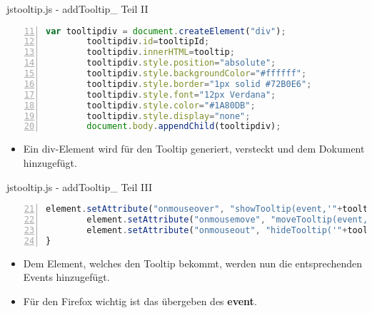 \begin{frame}[<+->][fragile]{jstooltip.js - addTooltip\_ Teil II}
\tiny{\begin{lstlisting}[language=JavaScript, 
		   numbers=left,
		   numbersep=3pt,
		   breaklines=true,
		   firstnumber=11]
        var tooltipdiv = document.createElement("div");
        tooltipdiv.id=tooltipId;
        tooltipdiv.innerHTML=tooltip;
        tooltipdiv.style.position="absolute";
        tooltipdiv.style.backgroundColor="#ffffff";
        tooltipdiv.style.border="1px solid #72B0E6";
        tooltipdiv.style.font="12px Verdana";
        tooltipdiv.style.color="#1A80DB";
        tooltipdiv.style.display="none";
        document.body.appendChild(tooltipdiv);
\end{lstlisting}}
\normalsize
\pause
\begin{itemize}
\item Ein div-Element wird für den Tooltip generiert, versteckt und dem Dokument hinzugefügt.
\end{itemize}
\end{frame}
\begin{frame}[<+->][fragile]{jstooltip.js - addTooltip\_ Teil III}
\tiny{\begin{lstlisting}[language=JavaScript, 
		   numbers=left,
		   numbersep=3pt,
		   breaklines=true,
		   firstnumber=21]
        element.setAttribute("onmouseover", "showTooltip(event,'"+tooltipId+"', '"+tooltip+"',"+milliseconds+");");
        element.setAttribute("onmousemove", "moveTooltip(event,'"+tooltipId+"');");
        element.setAttribute("onmouseout", "hideTooltip('"+tooltipId+"');");
}
\end{lstlisting}}
\normalsize
\pause
\begin{itemize}
\item Dem Element, welches den Tooltip bekommt, werden nun die entsprechenden Events hinzugefügt.
\item Für den Firefox wichtig ist das übergeben des \textbf{event}.
\end{itemize}
\end{frame}
